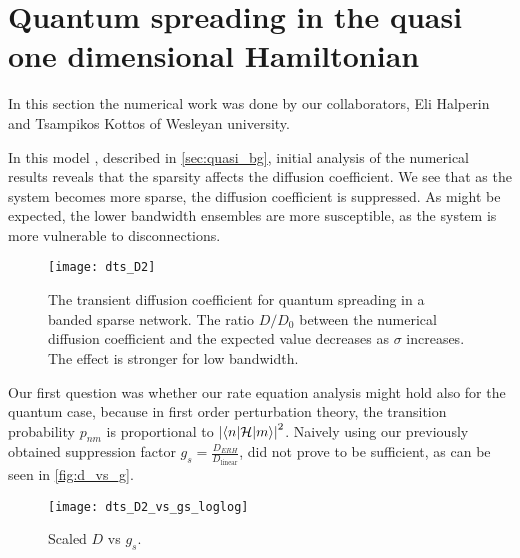 \section{Quantum spreading in the quasi one dimensional Hamiltonian}

In this section the numerical work was done by our collaborators,
Eli Halperin and Tsampikos Kottos of Wesleyan university.

In this model , described in \autoref{sec:quasi_bg}, initial analysis of
the numerical results reveals that the sparsity affects the diffusion coefficient.
We see that as the system becomes more sparse, the diffusion coefficient is suppressed. 
As might be expected, the lower bandwidth ensembles are more
susceptible, as the system is more vulnerable to disconnections.


\begin{figure}
\texttt{[image: dts\_D2]}
\caption{The transient diffusion coefficient for quantum spreading in
a banded sparse network. The ratio $D/D_0$ between the numerical diffusion 
coefficient and the expected value decreases as $\sigma$ increases. The effect
is stronger for low bandwidth.}
\end{figure}


Our first question was whether our rate equation analysis might
hold also for the quantum case, because in first order perturbation theory,
the transition probability $p_{nm}$ is proportional to $\left|\left\langle n|\mathcal{H} | m \right\rangle\right|^2$.
Naively using our previously obtained suppression factor $g_s = \frac{D_{ERH}}{D_{\textrm{linear}}}$,
did not prove to be sufficient, as can be seen in \autoref{fig:d_vs_g}.

\begin{figure}
\texttt{[image: dts\_D2\_vs\_gs\_loglog]}
\caption{Scaled $D$ vs $g_s$. }\label{fig:d_vs_g}
\end{figure}
